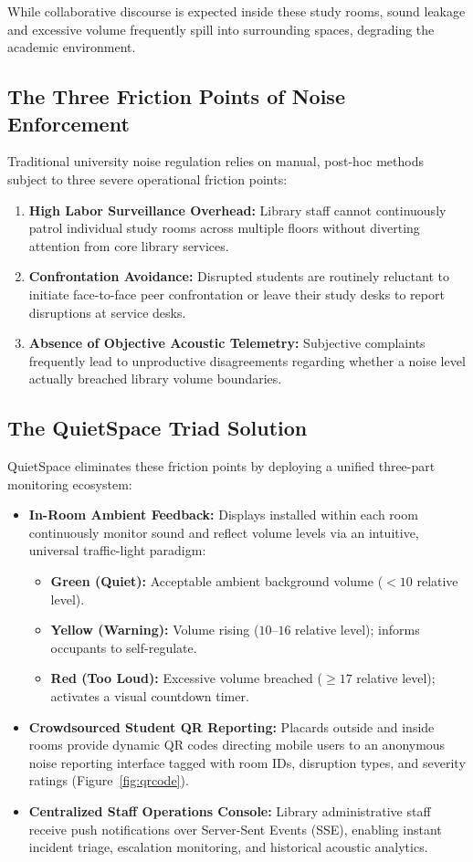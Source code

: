 \documentclass[11pt,a4paper]{article}
\begin{document}
While collaborative discourse is expected inside these study rooms, sound leakage and excessive volume frequently spill into surrounding spaces, degrading the academic environment.

\subsection{The Three Friction Points of Noise Enforcement}
Traditional university noise regulation relies on manual, post-hoc methods subject to three severe operational friction points:
\begin{enumerate}[leftmargin=*]
    \item \textbf{High Labor Surveillance Overhead:} Library staff cannot continuously patrol individual study rooms across multiple floors without diverting attention from core library services.
    \item \textbf{Confrontation Avoidance:} Disrupted students are routinely reluctant to initiate face-to-face peer confrontation or leave their study desks to report disruptions at service desks.
    \item \textbf{Absence of Objective Acoustic Telemetry:} Subjective complaints frequently lead to unproductive disagreements regarding whether a noise level actually breached library volume boundaries.
\end{enumerate}

\subsection{The QuietSpace Triad Solution}
QuietSpace eliminates these friction points by deploying a unified three-part monitoring ecosystem:
\begin{itemize}[leftmargin=*]
    \item \textbf{In-Room Ambient Feedback:} Displays installed within each room continuously monitor sound and reflect volume levels via an intuitive, universal traffic-light paradigm:
    \begin{itemize}
        \item \textbf{Green (Quiet):} Acceptable ambient background volume ($< 10$ relative level).
        \item \textbf{Yellow (Warning):} Volume rising ($10$--$16$ relative level); informs occupants to self-regulate.
        \item \textbf{Red (Too Loud):} Excessive volume breached ($\ge 17$ relative level); activates a visual countdown timer.
    \end{itemize}
    \item \textbf{Crowdsourced Student QR Reporting:} Placards outside and inside rooms provide dynamic QR codes directing mobile users to an anonymous noise reporting interface tagged with room IDs, disruption types, and severity ratings (Figure~\ref{fig:qrcode}).
    \item \textbf{Centralized Staff Operations Console:} Library administrative staff receive push notifications over Server-Sent Events (SSE), enabling instant incident triage, escalation monitoring, and historical acoustic analytics.
\end{itemize}
\end{document}
